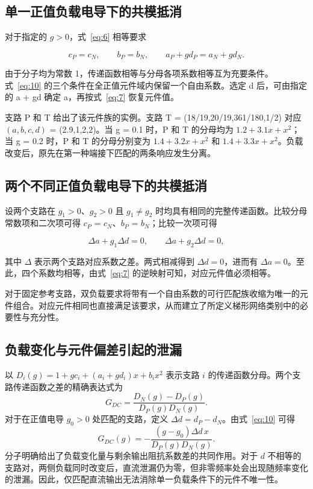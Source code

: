 \subsection{单一正值负载电导下的共模抵消}

对于指定的 \(g>0\)，式~\eqref{eq:6} 相等要求

\begin{equation}\label{eq:10}
c_P=c_N,\qquad b_P=b_N,\qquad
 a_P+gd_P=a_N+gd_N.
\end{equation}

由于分子均为常数 1，传递函数相等与分母各项系数相等互为充要条件。式~\eqref{eq:10} 的三个条件在全正值元件域内保留一个自由系数。选定 d 后，可由指定的 a + gd 确定 a，再按式~\eqref{eq:7} 恢复元件值。

支路 P 和 T 给出了该元件族的实例。支路 T = (18/19,20/19,361/180,1/2) 对应 \((a,b,c,d)\) = (2.9,1,2,2)。当 g = 0.1 时，P 和 T 的分母均为 \(1.2+3.1x+x^2\)；当 g = 0.2 时，P 和 T 的分母分别变为 \(1.4+3.2x+x^2\) 和 \(1.4+3.3x+x^2\)。负载改变后，原先在第一种端接下匹配的两条响应发生分离。

\subsection{两个不同正值负载电导下的共模抵消}

设两个支路在 \(g_1>0\)、\(g_2>0\) 且 \(g_1\ne g_2\) 时均具有相同的完整传递函数。比较分母常数项和二次项可得 \(c_P\) = \(c_N\)、\(b_P\) = \(b_N\)；比较一次项可得

\begin{equation}\label{eq:11}
\Delta a+g_1\Delta d=0,\qquad
\Delta a+g_2\Delta d=0,
\end{equation}

其中 \(\Delta\) 表示两个支路对应系数之差。两式相减得到 \(\Delta d=0\)，进而有 \(\Delta a=0\)。至此，四个系数均相等，由式~\eqref{eq:7} 的逆映射可知，对应元件值必须相等。

对于固定参考支路，双负载要求将带有一个自由系数的可行匹配族收缩为唯一的元件组合。对应元件相同也直接满足该要求，从而建立了所定义梯形网络类别中的必要性与充分性。


\subsection{负载变化与元件偏差引起的泄漏}

以 $D_i(g)=1+gc_i+(a_i+gd_i)x+b_ix^2$ 表示支路 $i$ 的传递函数分母。两个支路传递函数之差的精确表达式为
\begin{equation}\label{eq:load-leakage}
G_{DC}=\frac{D_N(g)-D_P(g)}{D_P(g)D_N(g)}.
\end{equation}
对于在正值电导 $g_0>0$ 处匹配的支路，定义 $\Delta d=d_P-d_N$。由式~\eqref{eq:10} 可得
\begin{equation}\label{eq:load-shift}
G_{DC}(g)=-\frac{(g-g_0)\Delta d\,x}{D_P(g)D_N(g)}.
\end{equation}
分子明确给出了负载变化量与剩余输出阻抗系数差的共同作用。对于 $d$ 不相等的支路对，两侧负载同时改变后，直流泄漏仍为零，但非零频率处会出现随频率变化的泄漏。因此，仅匹配直流输出无法消除单一负载条件下的元件不唯一性。

